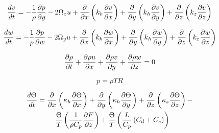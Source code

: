\begin{equation}
\label{mom_conserv_turb_v}
    \displaystyle\frac{d v}{d t} = -\frac{1}{\rho}\displaystyle\frac{\partial p}{\partial y} - 2\Omega_zu +  
    \frac{\partial}{\partial x} \left( k_h \displaystyle\frac{\partial v}{\partial x} \right) + 
    \frac{\partial}{\partial y} \left( k_h \displaystyle\frac{\partial v}{\partial y} \right) + 
    \frac{\partial}{\partial z} \left( k_z \displaystyle\frac{\partial v}{\partial z} \right)
\end{equation}

\begin{equation}
\label{mom_conserv_turb_w}
    \displaystyle\frac{d w}{d t} = -\frac{1}{\rho}\displaystyle\frac{\partial p}{\partial w} - 2\Omega_yu +  
    \frac{\partial}{\partial x} \left( k_h \displaystyle\frac{\partial w}{\partial x} \right) + 
    \frac{\partial}{\partial y} \left( k_h \displaystyle\frac{\partial w}{\partial y} \right) + 
    \frac{\partial}{\partial z} \left( k_z \displaystyle\frac{\partial w}{\partial z} \right)
\end{equation}

\begin{equation}
\label{mass_conserv_turb}
    \displaystyle\frac{\partial \rho}{\partial t} + \displaystyle\frac{\partial \rho u}{\partial x} + \displaystyle\frac{\partial \rho v}{\partial y} + \displaystyle\frac{\partial \rho w}{\partial z} = 0 
\end{equation}

\begin{equation}
\label{ideal_gas}
    p = \rho TR 
\end{equation}

\begin{multline}
    \label{temp_conserv_turb}
    \displaystyle\frac{d \Theta}{d t} =  
    \frac{\partial}{\partial x} \left( \kappa_h \displaystyle\frac{\partial \Theta}{\partial x} \right) + 
    \frac{\partial}{\partial y} \left( \kappa_h \displaystyle\frac{\partial \Theta}{\partial y} \right) + 
    \frac{\partial}{\partial z} \left( \kappa_z \displaystyle\frac{\partial \Theta}{\partial z} \right) - \\
  - \frac{\Theta}{T} \left( \frac{1}{\rho C_p} \displaystyle\frac{\partial F}{\partial z} \right) + 
    \frac{\Theta}{T} \left( \frac{L}{     C_p} \left( C_d + C_e \right) \right)
\end{multline}


